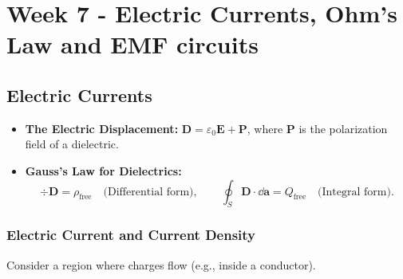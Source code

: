 
\section{Week 7 - Electric Currents, Ohm's Law and EMF circuits}
\subsection{Electric Currents}
\begin{remark}
\begin{itemize}
    \item \textbf{The Electric Displacement:} $\bm{D} = \varepsilon_0 \bm{E} + \bm{P}$, where $\bm{P}$ is the polarization field of a dielectric.
    \item \textbf{Gauss's Law for Dielectrics:}
    \begin{equation*}
        \div{\bm{D}} = \rho_{\text{free}} \quad \text{(Differential form)}, \qquad \oint_S \bm{D} \cdot \dd{\bm{a}} = Q_{\text{free}} \quad \text{(Integral form)}.
    \end{equation*}
\end{itemize}
\end{remark}

\subsubsection{Electric Current and Current Density}

Consider a region where charges flow (e.g., inside a conductor).

